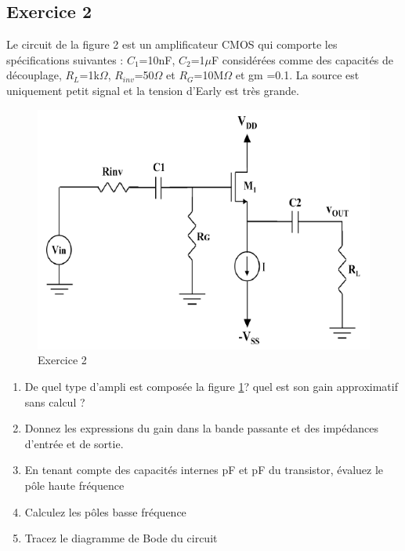 \documentclass[paper=a4, fontsize=11pt]{article} %
\numberwithin{equation}{section} %
\numberwithin{figure}{section} %
\numberwithin{table}{section} %
\begin{document}
\newpage
\subsection*{Exercice 2}
Le circuit de la figure 2 est un amplificateur CMOS qui comporte les spécifications suivantes : $C_1$=10nF, $C_2$=1$\mu$F considérées comme des capacités de découplage, $R_L$=1k$\Omega$, $R_{inv}$=50$\Omega$ et $R_G$=10M$\Omega$ et gm =0.1.
La source \vin est uniquement petit signal et la tension d'Early \vea est très grande.

\begin{figure}[!htbp]
   \centering
   \includegraphics[]{figure/fig6-2.png}
   \caption{Exercice 2}
   \label{fig6-2}
\end{figure}

\begin{enumerate}
\item De quel type d'ampli est composée la figure \ref{fig6-2}? quel est son gain approximatif sans calcul ?
\item Donnez les expressions du gain dans la bande passante et des impédances d'entrée et de sortie.
\item En tenant compte des capacités internes  pF et  pF du transistor, évaluez le pôle haute fréquence
\item Calculez les pôles basse fréquence
\item Tracez le diagramme de Bode du circuit
\end{enumerate}
\end{document}
